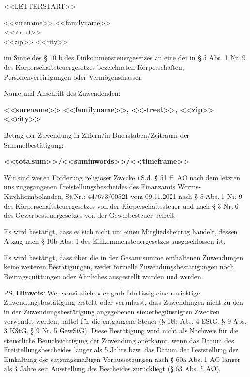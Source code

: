 \documentclass[fontsize=11pt, twoside]{scrlttr2}
\begin{document}

<<LETTERSTART>>
\begin{letter}{<<surename>> <<familyname>>\\<<street>>\\<<zip>> <<city>>} %

\opening{im Sinne des § 10 b des Einkommensteuergesetzes an eine der in § 5 Abs. 1 Nr. 9 des Körperschaftsteuergesetzes bezeichneten Körperschaften, Personenvereinigungen oder Vermögensmassen}

Name und Anschrift des Zuwendenden:

\textbf{<<surename>> <<familyname>>, <<street>>, <<zip>> <<city>>} %

Betrag der Zuwendung in Ziffern/in Buchstaben/Zeitraum der Sammelbestätigung:

\textbf{<<totalsum>>/<<suminwords>>/<<timeframe>>} %

Wir sind wegen Förderung religiöser Zwecke i.S.d. § 51 ff. AO nach dem letzten uns zugegangenen Freistellungsbescheides des Finanzamts Worms-Kirchheimbolanden, St.Nr.: 44/673/00521 vom 09.11.2021 nach § 5 Abs. 1 Nr. 9 des Körperschaftsteuergesetzes von der Körperschaftssteuer und nach § 3 Nr. 6 des Gewerbesteuergesetzes von der Gewerbesteuer befreit.

Es wird bestätigt, dass es sich nicht um einen Mitgliedsbeitrag handelt, dessen Abzug nach § 10b Abs. 1 des Einkommensteuergesetzes ausgeschlossen ist.

Es wird bestätigt, dass über die in der Gesamtsumme enthaltenen Zuwendungen keine weiteren Bestätigungen, weder formelle Zuwendungsbestätigungen noch Beitragsquittungen oder Ähnliches ausgestellt wurden und werden.
\enlargethispage{5\baselineskip}
\closing{}

\ps\footnotesize
\textbf{Hinweis:} Wer vorsätzlich oder grob fahrlässig eine unrichtige Zuwendungsbestätigung erstellt oder veranlasst, dass Zuwendungen nicht zu den in der Zuwendungsbestätigung angegebenen steuerbegünstigten Zwecken verwendet werden, haftet für die entgangene Steuer (§ 10b Abs. 4 EStG, § 9 Abs. 3 KStG, § 9 Nr. 5 GewStG). Diese Bestätigung wird nicht als Nachweis für die steuerliche Berücksichtigung der Zuwendung anerkannt, wenn das Datum des Freistellungsbescheides länger als 5 Jahre bzw. das Datum der Feststellung der Einhaltung der satzungsmäßigen Voraussetzungen nach § 60a Abs. 1 AO länger als 3 Jahre seit Ausstellung des Bescheides zurückliegt (§ 63 Abs. 5 AO).


\end{letter}
\end{document}
